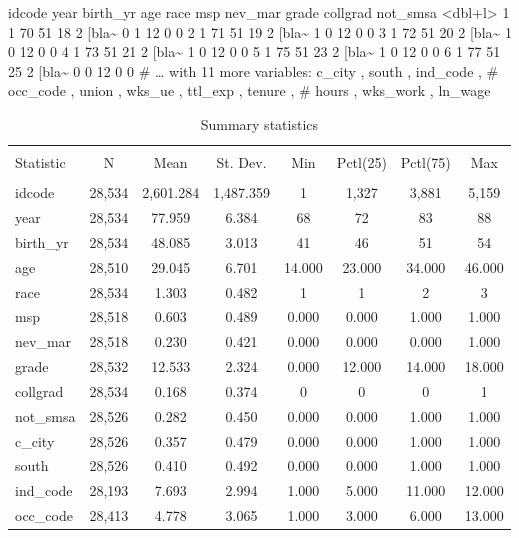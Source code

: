 \documentclass[
  12pt,
]{article}
\begin{document}
idcode year birth\_yr age race msp nev\_mar grade collgrad not\_smsa
\textless dbl+l\textgreater{}
1 1 70 51 18 2 {[}bla\textasciitilde{} 0 1 12 0 0
2 1 71 51 19 2 {[}bla\textasciitilde{} 1 0 12 0 0
3 1 72 51 20 2 {[}bla\textasciitilde{} 1 0 12 0 0
4 1 73 51 21 2 {[}bla\textasciitilde{} 1 0 12 0 0
5 1 75 51 23 2 {[}bla\textasciitilde{} 1 0 12 0 0
6 1 77 51 25 2 {[}bla\textasciitilde{} 0 0 12 0 0
\# \ldots{} with 11 more variables: c\_city , south , ind\_code ,
\# occ\_code , union , wks\_ue , ttl\_exp , tenure ,
\# hours , wks\_work , ln\_wage

\begin{table}[ht] \centering 
  \caption{Summary statistics} 
  \label{tab1} 
\begin{tabular}{@{\extracolsep{5pt}}lccccccc} 
\\[-1.8ex]\hline 
\hline \\[-1.8ex] 
Statistic & \multicolumn{1}{c}{N} & \multicolumn{1}{c}{Mean} & \multicolumn{1}{c}{St. Dev.} & \multicolumn{1}{c}{Min} & \multicolumn{1}{c}{Pctl(25)} & \multicolumn{1}{c}{Pctl(75)} & \multicolumn{1}{c}{Max} \\ 
\hline \\[-1.8ex] 
idcode & 28,534 & 2,601.284 & 1,487.359 & 1 & 1,327 & 3,881 & 5,159 \\ 
year & 28,534 & 77.959 & 6.384 & 68 & 72 & 83 & 88 \\ 
birth\_yr & 28,534 & 48.085 & 3.013 & 41 & 46 & 51 & 54 \\ 
age & 28,510 & 29.045 & 6.701 & 14.000 & 23.000 & 34.000 & 46.000 \\ 
race & 28,534 & 1.303 & 0.482 & 1 & 1 & 2 & 3 \\ 
msp & 28,518 & 0.603 & 0.489 & 0.000 & 0.000 & 1.000 & 1.000 \\ 
nev\_mar & 28,518 & 0.230 & 0.421 & 0.000 & 0.000 & 0.000 & 1.000 \\ 
grade & 28,532 & 12.533 & 2.324 & 0.000 & 12.000 & 14.000 & 18.000 \\ 
collgrad & 28,534 & 0.168 & 0.374 & 0 & 0 & 0 & 1 \\ 
not\_smsa & 28,526 & 0.282 & 0.450 & 0.000 & 0.000 & 1.000 & 1.000 \\ 
c\_city & 28,526 & 0.357 & 0.479 & 0.000 & 0.000 & 1.000 & 1.000 \\ 
south & 28,526 & 0.410 & 0.492 & 0.000 & 0.000 & 1.000 & 1.000 \\ 
ind\_code & 28,193 & 7.693 & 2.994 & 1.000 & 5.000 & 11.000 & 12.000 \\ 
occ\_code & 28,413 & 4.778 & 3.065 & 1.000 & 3.000 & 6.000 & 13.000 \\ 

\end{tabular}
\end{table}
\end{document}
